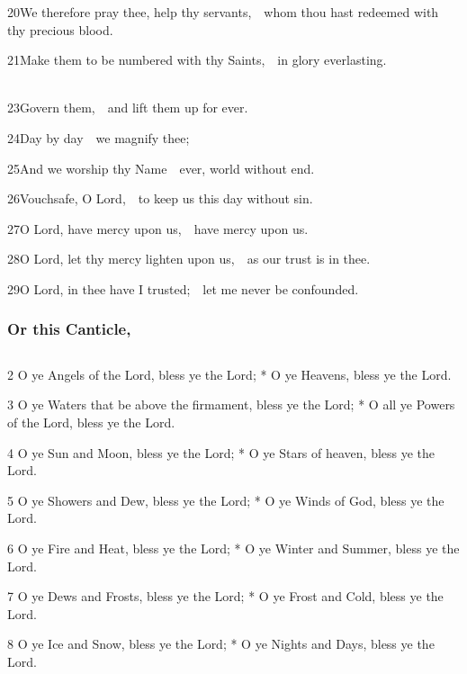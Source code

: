 20\enspace We therefore pray thee, help thy servants,\ \star\ whom thou hast redeemed with thy precious blood.

21\enspace Make them to be numbered with thy Saints,\ \star\ in glory everlasting.


\\
23\enspace Govern them,\ \star\ and lift them up for ever.

24\enspace Day by day\ \star\ we magnify thee;

25\enspace And we worship thy Name\ \star\ ever, world without end.

26\enspace Vouchsafe, O Lord,\ \star\ to keep us this day without sin.

27\enspace O Lord, have mercy upon us,\ \star\ have mercy upon us.

28\enspace O Lord, let thy mercy lighten upon us,\ \star\ as our trust is in thee.

29\enspace O Lord, in thee have I trusted;\ \star\ let me never be confounded.

\subsubsection{Or this Canticle,}

\subsection{}


2 O ye Angels of the Lord, bless ye the Lord; * O ye Heavens, bless ye the Lord.

3 O ye Waters that be above the firmament, bless ye the Lord; * O all ye Powers of the Lord, bless ye the Lord.

4 O ye Sun and Moon, bless ye the Lord; * O ye Stars of heaven, bless ye the Lord.

5 O ye Showers and Dew, bless ye the Lord; * O ye Winds of God, bless ye the Lord.

6 O ye Fire and Heat, bless ye the Lord; * O ye Winter and Summer, bless ye the Lord.

7 O ye Dews and Frosts, bless ye the Lord; * O ye Frost and Cold, bless ye the Lord.

8 O ye Ice and Snow, bless ye the Lord; * O ye Nights and Days, bless ye the Lord.

